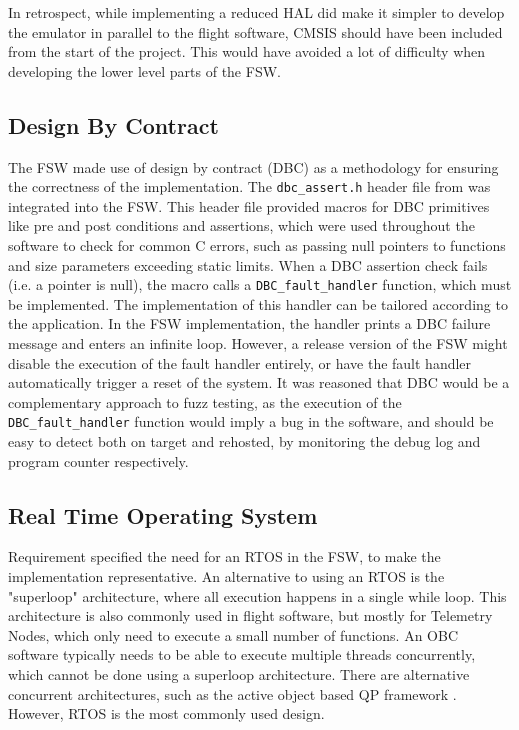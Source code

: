 \documentclass[../report.tex]{subfiles}
\begin{document}
In retrospect, while implementing a reduced HAL did make it simpler to develop
the emulator in parallel to the flight software, CMSIS should have been
included from the start of the project. This would have avoided a lot of
difficulty when developing the lower level parts of the FSW.

\subsection{Design By Contract}

The FSW made use of design by contract (DBC) as a methodology for ensuring the
correctness of the implementation. The \lstinline|dbc_assert.h| header file
from \citet{dbc_assert} was integrated into the FSW. This header file provided
macros for DBC primitives like pre and post conditions and assertions, which
were used throughout the software to check for common C errors, such as passing
null pointers to functions and size parameters exceeding static limits. When a
DBC assertion check fails (i.e. a pointer is null), the macro calls a
\lstinline|DBC_fault_handler| function, which must be implemented. The
implementation of this handler can be tailored according to the application. In
the FSW implementation, the handler prints a DBC failure message and enters an
infinite loop. However, a release version of the FSW might disable the
execution of the fault handler entirely, or have the fault handler
automatically trigger a reset of the system. It was reasoned that DBC would be
a complementary approach to fuzz testing, as the execution of the
\lstinline|DBC_fault_handler| function would imply a bug in the software, and
should be easy to detect both on target and rehosted, by monitoring the debug
log and program counter respectively.

\subsection{Real Time Operating System} \label{sec:fsw-rtos}

Requirement  specified the need for an RTOS in the FSW, to make
the implementation representative. An alternative to using an RTOS is the
"superloop" architecture, where all execution happens in a single while loop.
This architecture is also commonly used in flight software, but mostly for
Telemetry Nodes, which only need to execute a small number of functions. An OBC
software typically needs to be able to execute multiple threads concurrently,
which cannot be done using a superloop architecture. There are alternative
concurrent architectures, such as the active object based QP framework
\citep{QP}. However, RTOS is the most commonly used design.
\end{document}
